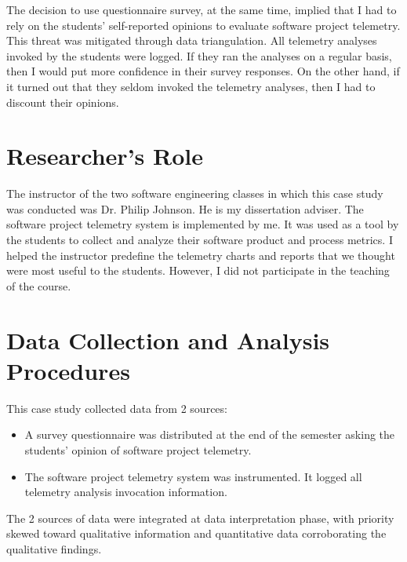 The decision to use questionnaire survey, at the same time, implied that I had to rely on the students' self-reported opinions to evaluate software project telemetry. This threat was mitigated through data triangulation. All telemetry analyses invoked by the students were logged. If they ran the analyses on a regular basis, then I would put more confidence in their survey responses. On the other hand, if it turned out that they seldom invoked the telemetry analyses, then I had to discount their opinions. 






\section{Researcher's Role} \label{EvaluationInClassroom:Role}

The instructor of the two software engineering classes in which this case study was conducted was Dr. Philip Johnson. He is my dissertation adviser. The software project telemetry system is implemented by me. It was used as a tool by the students to collect and analyze their software product and process metrics. I helped the instructor predefine the telemetry charts and reports that we thought were most useful to the students. However, I did not participate in the teaching of the course.





\section{Data Collection and Analysis Procedures} \label{EvaluationInClassroom:DataAnalysis}

This case study collected data from 2 sources:
\begin{itemize}
	\item A survey questionnaire was distributed at the end of the semester asking the students' opinion of software project telemetry.
	\item The software project telemetry system was instrumented. It logged all telemetry analysis invocation information.
\end{itemize}
The 2 sources of data were integrated at data interpretation phase, with priority skewed toward qualitative information and quantitative data corroborating the qualitative findings.


